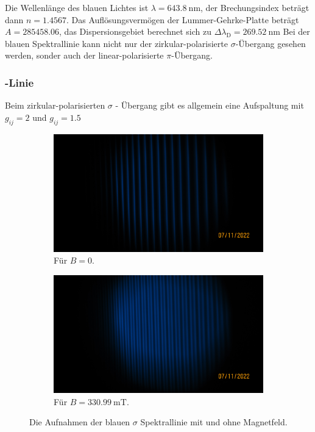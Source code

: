   \noindent Die Wellenlänge des blauen Lichtes ist $\lambda = \SI{643.8}{\nano\metre}$, der Brechungsindex beträgt dann $n = \num{1.4567}$. 
  Das Auflösungsvermögen der Lummer-Gehrke-Platte beträgt $A = \num{285458.06}$, das Dispersionsgebiet berechnet sich zu $\Delta \lambda_\text{D} = \SI{269.52}{\nano\metre}$
  Bei der blauen Spektrallinie kann nicht nur der zirkular-polarisierte $\sigma$-Übergang gesehen werden, sonder auch der linear-polarisierte 
  $\pi$-Übergang. 

  \subsubsection{-Linie}

    \noindent 
    Beim zirkular-polarisierten $\sigma$ - Übergang gibt es allgemein eine Aufspaltung mit $g_{ij} = \num{2}$ und $g_{ij} = \num{1.5}$

    \begin{figure}%
      \begin{subfigure}{0.48\textwidth}%
        \centering%
        \includegraphics[width=\textwidth]{pictures/IMG_0007.JPG}%
        \caption{Für $B = \num{0}$.}%
        \label{fig:pic_blaus_0}%
      \end{subfigure}%
      \hfill%
      \begin{subfigure}{0.48\textwidth}%
        \centering%
        \includegraphics[width=\textwidth]{pictures/IMG_0008.JPG}%
        \caption{Für $B = \SI{330.99}{\milli\tesla}$.}%
        \label{fig:pic_blaus_B}%
      \end{subfigure}%
      \caption{Die Aufnahmen der blauen $\sigma$ Spektrallinie mit und ohne Magnetfeld.}%
      \label{fig:blaus}%
    \end{figure}

